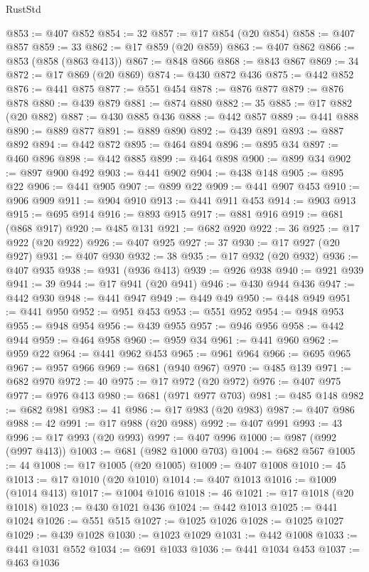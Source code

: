 \begin{lexlean}{RustStd}
\begin{coremodule}
{\begin{coremodule}
{{{{{{{{{{{{{{{{{{{{{{{{{@853 := @407 @852
@854 := 32
@857 := @17 @854 (@20 @854)
@858 := @407 @857
@859 := 33
@862 := @17 @859 (@20 @859)
@863 := @407 @862
@866 := @853 (@858 (@863 @413))
@867 := @848 @866
@868 := @843 @867
@869 := 34
@872 := @17 @869 (@20 @869)
@874 := @430 @872 @436
@875 := @442 @852
@876 := @441 @875
@877 := @551 @454
@878 := @876 @877
@879 := @876 @878
@880 := @439 @879
@881 := @874 @880
@882 := 35
@885 := @17 @882 (@20 @882)
@887 := @430 @885 @436
@888 := @442 @857
@889 := @441 @888
@890 := @889 @877
@891 := @889 @890
@892 := @439 @891
@893 := @887 @892
@894 := @442 @872
@895 := @464 @894
@896 := @895 @34
@897 := @460 @896
@898 := @442 @885
@899 := @464 @898
@900 := @899 @34
@902 := @897 @900 @492
@903 := @441 @902
@904 := @438 @148
@905 := @895 @22
@906 := @441 @905
@907 := @899 @22
@909 := @441 @907 @453
@910 := @906 @909
@911 := @904 @910
@913 := @441 @911 @453
@914 := @903 @913
@915 := @695 @914
@916 := @893 @915
@917 := @881 @916
@919 := @681 (@868 @917)
@920 := @485 @131
@921 := @682 @920
@922 := 36
@925 := @17 @922 (@20 @922)
@926 := @407 @925
@927 := 37
@930 := @17 @927 (@20 @927)
@931 := @407 @930
@932 := 38
@935 := @17 @932 (@20 @932)
@936 := @407 @935
@938 := @931 (@936 @413)
@939 := @926 @938
@940 := @921 @939
@941 := 39
@944 := @17 @941 (@20 @941)
@946 := @430 @944 @436
@947 := @442 @930
@948 := @441 @947
@949 := @449 @49
@950 := @448 @949
@951 := @441 @950
@952 := @951 @453
@953 := @551 @952
@954 := @948 @953
@955 := @948 @954
@956 := @439 @955
@957 := @946 @956
@958 := @442 @944
@959 := @464 @958
@960 := @959 @34
@961 := @441 @960
@962 := @959 @22
@964 := @441 @962 @453
@965 := @961 @964
@966 := @695 @965
@967 := @957 @966
@969 := @681 (@940 @967)
@970 := @485 @139
@971 := @682 @970
@972 := 40
@975 := @17 @972 (@20 @972)
@976 := @407 @975
@977 := @976 @413
@980 := @681 (@971 @977 @703)
@981 := @485 @148
@982 := @682 @981
@983 := 41
@986 := @17 @983 (@20 @983)
@987 := @407 @986
@988 := 42
@991 := @17 @988 (@20 @988)
@992 := @407 @991
@993 := 43
@996 := @17 @993 (@20 @993)
@997 := @407 @996
@1000 := @987 (@992 (@997 @413))
@1003 := @681 (@982 @1000 @703)
@1004 := @682 @567
@1005 := 44
@1008 := @17 @1005 (@20 @1005)
@1009 := @407 @1008
@1010 := 45
@1013 := @17 @1010 (@20 @1010)
@1014 := @407 @1013
@1016 := @1009 (@1014 @413)
@1017 := @1004 @1016
@1018 := 46
@1021 := @17 @1018 (@20 @1018)
@1023 := @430 @1021 @436
@1024 := @442 @1013
@1025 := @441 @1024
@1026 := @551 @515
@1027 := @1025 @1026
@1028 := @1025 @1027
@1029 := @439 @1028
@1030 := @1023 @1029
@1031 := @442 @1008
@1033 := @441 @1031 @552
@1034 := @691 @1033
@1036 := @441 @1034 @453
@1037 := @463 @1036
}}}}}}}}}}}}}}}}}}}}}}}}}
\end{coremodule}}
\end{coremodule}
\end{lexlean}
